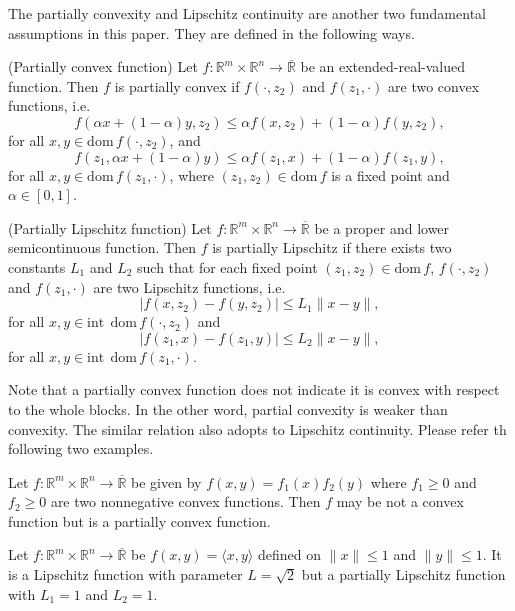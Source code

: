 \documentclass{svjour3}                %
\def \R {{\mathbb{R}}}
\newcommand{\dom}[1]{\mathrm{dom}\,{#1}} %
\newcommand{\inter}[1]{\mathrm{int}\,{#1}} %
\begin{document}
The partially convexity and Lipschitz continuity are another two fundamental assumptions in this paper. They are defined in the following ways.
\begin{definition}
(Partially convex function) Let $f:\R^m \times \R^n\rightarrow \overline{\R}$ be an extended-real-valued function. Then $f$ is partially convex if $f(\cdot,z_2)$ and $f(z_1,\cdot)$ are two convex functions, i.e. 
\begin{equation*}
f(\alpha x + (1-\alpha)y,z_2)\leq \alpha f(x,z_2) + (1-\alpha)f(y,z_2),
\end{equation*}
for all $x,y\in\dom f(\cdot,z_2)$, and
\begin{equation*}
f(z_1,\alpha x + (1-\alpha)y)\leq \alpha f(z_1,x) + (1-\alpha)f(z_1,y),
\end{equation*}
for all $x,y\in\dom f(z_1,\cdot)$, where $(z_1,z_2)\in\dom f$ is a fixed point and $\alpha\in[0,1]$.
\end{definition}
	
\begin{definition}
(Partially Lipschitz function) Let $f:\R^m \times \R^n \rightarrow \overline{\R}$ be a proper and lower semicontinuous function. Then $f$ is partially Lipschitz if there exists two constants $L_1$ and $L_2$ such that for each fixed point $(z_1,z_2)\in\dom f$, $f(\cdot,z_2)$ and $f(z_1,\cdot)$ are two Lipschitz functions, i.e.
\begin{equation*}
	|f(x,z_2)-f(y,z_2)| \leq L_1 \|x-y\| ,
\end{equation*}
for all $x,y\in \inter \; \dom f(\cdot,z_2)$ and
\begin{equation*}
	|f(z_1,x)-f(z_1,y)|\leq L_2 \|x-y\|,
\end{equation*}
for all $x,y\in \inter \; \dom f(z_1,\cdot)$.
\end{definition}
Note that a partially convex function does not indicate it is convex with respect to the whole blocks. In the other word, partial convexity is weaker than convexity. The similar relation also adopts to Lipschitz continuity. Please refer th following two examples.
\begin{example}
Let $f:\R^m\times\R^n\rightarrow\overline{\R}$ be given by $f(x,y)=f_1(x)f_2(y)$ where $f_1\geq 0$ and $f_2\geq 0$ are two nonnegative convex functions. Then $f$ may be not a convex function but is a partially convex function.
\end{example}
\begin{example}
Let $f:\R^m\times\R^n\rightarrow\overline{\R}$ be $f(x,y)=\langle x,y \rangle$ defined on $\|x\|\leq 1$ and $\|y\|\leq 1$. It is a Lipschitz function with parameter $L=\sqrt{2}$ but a partially Lipschitz function with $L_1=1$ and $L_2=1$.
\end{example}
\end{document}
